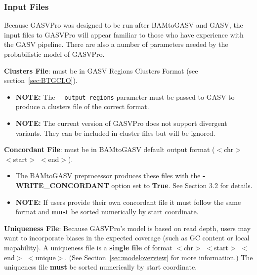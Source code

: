 \documentclass[11pt]{article}
\begin{document}
\subsubsection{Input Files}
Because GASVPro was designed to be run after BAMtoGASV and GASV, the input files to GASVPro will appear familiar to those who have experience with the GASV pipeline. There are also a number of parameters needed by the probabilistic model of GASVPro.

\begin{description}
\item{\bf Clusters File}: must be in GASV Regions Clusters Format (see section~\ref{sec:BTGCLO}). 
\begin{itemize}
\item {\bf NOTE:} The \verb+--output regions+ parameter must be passed to GASV to produce a clusters file of the correct format. 
\item {\bf NOTE:} The current version of GASVPro does not support divergent variants. They can be included in cluster files but will be ignored. 
\end{itemize}
\item{\bf Concordant File}: must be in BAMtoGASV default output format ($<$chr$>$ $<$start$>$ $<$end$>$). 
\begin{itemize}
\item The BAMtoGASV preprocessor produces these files with the {\bf-WRITE\_CONCORDANT} option set to {\bf True}. See Section 3.2 for details. 
\item {\bf NOTE:} If users provide their own concordant file it must follow the same format and {\bf must} be sorted numerically by start coordinate.
\end{itemize}
\item{\bf Uniqueness File}:  Because GASVPro's model is based on read depth, users may want to incorporate biases in the expected coverage (such as GC content or local mapability). A uniqueness file is a {\bf single file} of format $<$chr$>$ $<$start$>$ $<$end$>$ $<$unique$>$. (See Section~\ref{sec:modeloverview} for more information.) The uniqueness file {\bf must} be sorted numerically by start coordinate.
\end{description}
\end{document}
